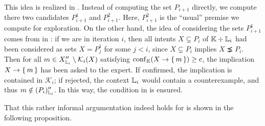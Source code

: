This idea is realized in .
Instead of computing the set $P_{i+1}$ directly, we compute there two candidates
$P_{i+1}^{1}$ and $P_{i+1}^{2}$.  Here, $P_{i+1}^{2}$ is the ``usual'' premise we compute
for exploration.  On the other hand, the idea of considering the sets $P_{i+1}^{1}$ comes
from  in : if we are in iteration
$i$, then all intents $X \subsetneq P_{i}$ of ${\mathbb{K}} \div {\ensuremath{\mathbb{L}}}_{i}$ had been considered
as sets $X = P_{j}^{1}$ for some $j < i$, since $X \subsetneq P_{i}$ implies $X \precneq
P_{i}$.  Then for all $m \in X_{{\mathbb{L}}_{i}}'' \setminus \mathcal{K}_{i}(X)$ satisfying
$\operatorname{conf}_{{\mathbb{K}}}(X \to {\ensuremath{\{\,m\,\}}}) \ge c$, the implication $X \to {\ensuremath{\{\,m\,\}}}$ has been asked to
the expert.  If confirmed, the implication is contained in $\mathcal{K}_{i}$; if rejected,
the context ${\mathbb{L}}_{i}$ would contain a counterexample, and thus $m \notin (P_{i})_{{\mathbb{L}}_{i}}''$.  In this way, the condition in  is ensured.

That this rather informal argumentation indeed holds for
 is shown in the following
proposition.

